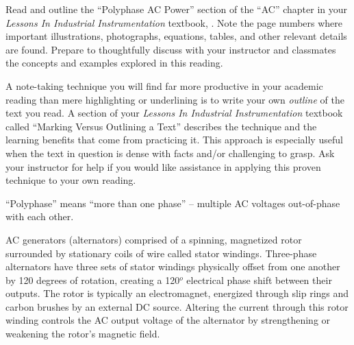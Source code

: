 

Read and outline the ``Polyphase AC Power'' section of the ``AC'' chapter in your {\it Lessons In Industrial Instrumentation} textbook, .  Note the page numbers where important illustrations, photographs, equations, tables, and other relevant details are found.  Prepare to thoughtfully discuss with your instructor and classmates the concepts and examples explored in this reading.

\vskip 30pt

A note-taking technique you will find far more productive in your academic reading than mere highlighting or underlining is to write your own {\it outline} of the text you read.  A section of your {\it Lessons In Industrial Instrumentation} textbook called ``Marking Versus Outlining a Text'' describes the technique and the learning benefits that come from practicing it.  This approach is especially useful when the text in question is dense with facts and/or challenging to grasp.  Ask your instructor for help if you would like assistance in applying this proven technique to your own reading.














``Polyphase'' means ``more than one phase'' -- multiple AC voltages out-of-phase with each other.

\vskip 10pt

AC generators (alternators) comprised of a spinning, magnetized rotor surrounded by stationary coils of wire called stator windings.  Three-phase alternators have three sets of stator windings physically offset from one another by 120 degrees of rotation, creating a 120$^{o}$ electrical phase shift between their outputs.  The rotor is typically an electromagnet, energized through slip rings and carbon brushes by an external DC source.  Altering the current through this rotor winding controls the AC output voltage of the alternator by strengthening or weakening the rotor's magnetic field.

